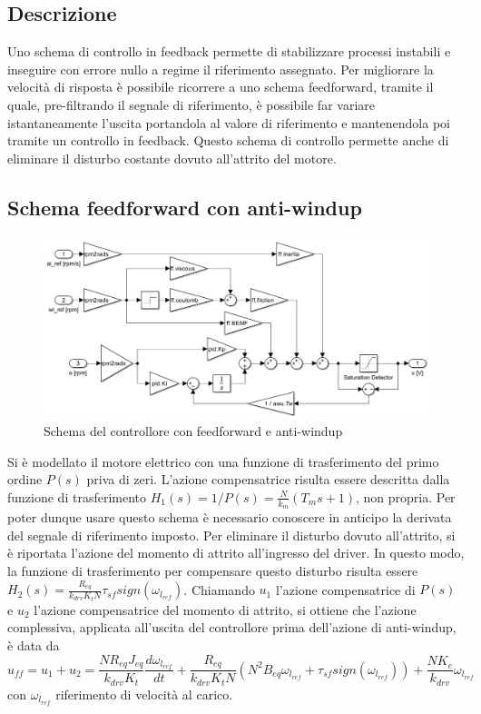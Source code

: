 \documentclass[a4paper, 11pt, Arial]{article}
\begin{document}
\subsection{Descrizione}
Uno schema di controllo in feedback permette di stabilizzare processi instabili e inseguire con errore nullo a regime il riferimento assegnato. Per migliorare la velocità di risposta è possibile ricorrere a uno schema feedforward, tramite il quale, pre-filtrando il segnale di riferimento, è possibile far variare istantaneamente l'uscita portandola al valore di riferimento e mantenendola poi tramite un controllo in feedback. Questo schema di controllo permette anche di eliminare il disturbo costante dovuto all'attrito del motore.

\subsection{Schema feedforward con anti-windup}
\begin{figure}[H]
    \centering
    \includegraphics[width=0.7\linewidth]{Images/ff.png}
    \caption{Schema del controllore con feedforward e anti-windup}
    \label{sim:ff}
\end{figure}
Si è modellato il motore elettrico con una funzione di trasferimento del primo ordine $P(s)$ priva di zeri. L'azione compensatrice risulta essere descritta dalla funzione di trasferimento $H_{1}(s) = 1 / P(s) = \frac{N}{k_{m}}(T_{m} s + 1)$, non propria. Per poter dunque usare questo schema è necessario conoscere in anticipo la derivata del segnale di riferimento imposto. Per eliminare il disturbo dovuto all'attrito, si è riportata l'azione del momento di attrito all'ingresso del driver. In questo modo, la funzione di trasferimento per compensare questo disturbo risulta essere $H_{2}(s) = \frac{R_{eq}}{k_{drv} K_{t} N} \tau_{sf} sign(\omega_{l_{ref}})$. Chiamando $u_{1}$ l'azione compensatrice di $P(s)$ e $u_2$ l'azione compensatrice del momento di attrito, si ottiene che l'azione complessiva, applicata all'uscita del controllore prima dell'azione di anti-windup, è data da
\begin{equation}
    u_{ff} = u_{1} + u_{2} = \frac{N R_{eq} J_{eq}}{k_{drv} K_{t}} \frac{d\omega_{l_{ref}}}{dt} + 
                            \frac{R_{eq}}{k_{drv} K_{t} N} (N^2 B_{eq} \omega_{l_{ref}} + \tau_{sf} sign(\omega_{l_{ref}})) + \frac{N K_{e}}{k_{drv}} \omega_{l_{ref}}
  \label{ff:tf}
\end{equation}
con $\omega_{l_{ref}}$ riferimento di velocità al carico.
\end{document}
